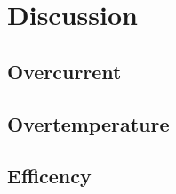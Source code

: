\chapter{Discussion}
\label{sec:disc}

\section{Overcurrent}
\label{sec:ovcu}

\section{Overtemperature}
\label{sec:ovte}

\section{Efficency}
\label{sec:eff}
